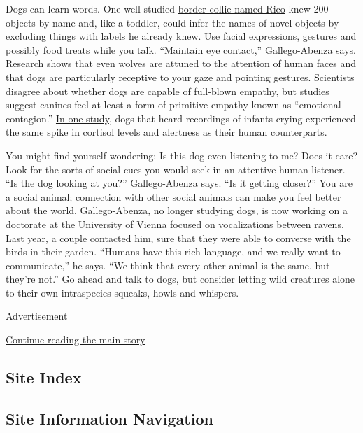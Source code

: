 Dogs can learn words. One well-studied
\href{http://science.sciencemag.org/content/304/5677/1682}{border collie
named Rico} knew 200 objects by name and, like a toddler, could infer
the names of novel objects by excluding things with labels he already
knew. Use facial expressions, gestures and possibly food treats while
you talk. ``Maintain eye contact,'' Gallego-Abenza says. Research shows
that even wolves are attuned to the attention of human faces and that
dogs are particularly receptive to your gaze and pointing gestures.
Scientists disagree about whether dogs are capable of full-blown
empathy, but studies suggest canines feel at least a form of primitive
empathy known as ``emotional contagion.''
\href{https://www.ncbi.nlm.nih.gov/pmc/articles/PMC5486498/}{In one
study}, dogs that heard recordings of infants crying experienced the
same spike in cortisol levels and alertness as their human counterparts.

You might find yourself wondering: Is this dog even listening to me?
Does it care? Look for the sorts of social cues you would seek in an
attentive human listener. ``Is the dog looking at you?'' Gallego-Abenza
says. ``Is it getting closer?'' You are a social animal; connection with
other social animals can make you feel better about the world.
Gallego-Abenza, no longer studying dogs, is now working on a doctorate
at the University of Vienna focused on vocalizations between ravens.
Last year, a couple contacted him, sure that they were able to converse
with the birds in their garden. ``Humans have this rich language, and we
really want to communicate,'' he says. ``We think that every other
animal is the same, but they're not.'' Go ahead and talk to dogs, but
consider letting wild creatures alone to their own intraspecies squeaks,
howls and whispers.

Advertisement

\protect\hyperlink{after-bottom}{Continue reading the main story}

\hypertarget{site-index}{%
\subsection{Site Index}\label{site-index}}

\hypertarget{site-information-navigation}{%
\subsection{Site Information
Navigation}\label{site-information-navigation}}

